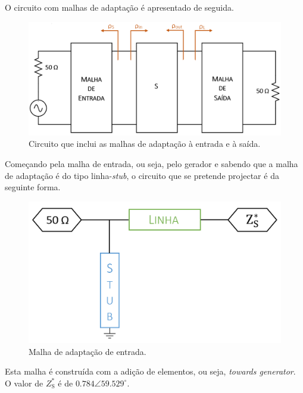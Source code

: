 \documentclass[11pt]{article}
\numberwithin{equation}{section}
\begin{document}
\vspace{1mm} 
O circuito com malhas de adaptação é apresentado de seguida.

\begin{figure}[H]
	\centering
	\includegraphics[keepaspectratio=true, scale=0.35]{teoricas/malhas}
	\vspace{-0.5em}
	\caption{Circuito que inclui as malhas de adaptação à entrada e à saída.}
	\vspace{-0.8em}
\end{figure}

Começando pela malha de entrada, ou seja, pelo gerador e sabendo que a malha de adaptação é do tipo linha-\textit{stub}, o circuito que se pretende projectar é da seguinte forma.

\begin{figure}[H]
	\centering
	\includegraphics[keepaspectratio=true, scale=0.25]{teoricas/malhaentrada}
	\vspace{-0.5em}
	\caption{Malha de adaptação de entrada.}
	\vspace{-0.8em}
\end{figure}

Esta malha é construída com a adição de elementos, ou seja, \textit{towards generator}. O valor de $Z_{\text{S}}^{*}$ é de $0.784\angle59.529 ^{\circ}$.
\end{document}
